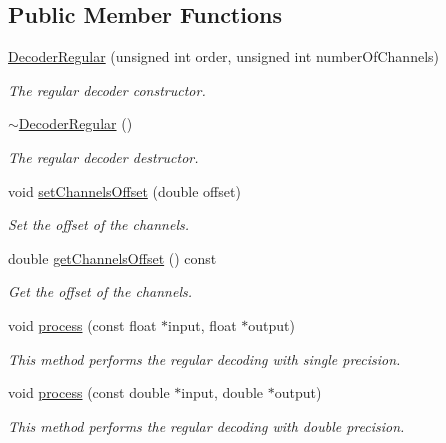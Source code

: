 \subsection*{Public Member Functions}
\begin{DoxyCompactItemize}
\item 
\hyperlink{class_hoa2_d_1_1_decoder_regular_a0666daa8b343e44ef7d90a31922cbecc}{Decoder\-Regular} (unsigned int order, unsigned int number\-Of\-Channels)
\begin{DoxyCompactList}\small\item\em The regular decoder constructor. \end{DoxyCompactList}\item 
\hyperlink{class_hoa2_d_1_1_decoder_regular_a04fe68432d2de773e8773cde9f0a2cad}{$\sim$\-Decoder\-Regular} ()
\begin{DoxyCompactList}\small\item\em The regular decoder destructor. \end{DoxyCompactList}\item 
void \hyperlink{class_hoa2_d_1_1_decoder_regular_a8ea45b4fafc13f941b597a7e829fc0d8}{set\-Channels\-Offset} (double offset)
\begin{DoxyCompactList}\small\item\em Set the offset of the channels. \end{DoxyCompactList}\item 
double \hyperlink{class_hoa2_d_1_1_decoder_regular_aa4dd9f25eac9fb517279cc310d9fe36f}{get\-Channels\-Offset} () const 
\begin{DoxyCompactList}\small\item\em Get the offset of the channels. \end{DoxyCompactList}\item 
void \hyperlink{class_hoa2_d_1_1_decoder_regular_a0df7ff818531d375909a2914d159b711}{process} (const float $\ast$input, float $\ast$output)
\begin{DoxyCompactList}\small\item\em This method performs the regular decoding with single precision. \end{DoxyCompactList}\item 
void \hyperlink{class_hoa2_d_1_1_decoder_regular_ab405af5dc134c282e25ca4d952bc0060}{process} (const double $\ast$input, double $\ast$output)
\begin{DoxyCompactList}\small\item\em This method performs the regular decoding with double precision. \end{DoxyCompactList}\end{DoxyCompactItemize}
